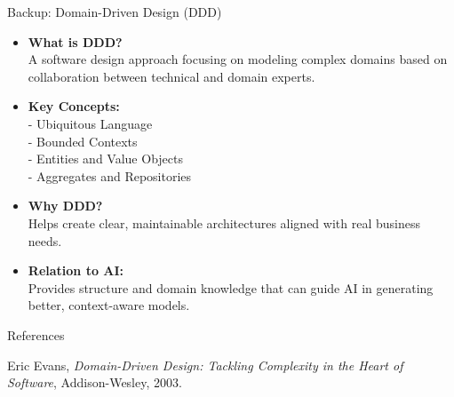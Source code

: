 \documentclass[aspectratio=169,12pt]{beamer}
\begin{document}
%
\begin{frame}{Backup: Domain-Driven Design (DDD)}
    \begin{itemize}
        \item \textbf{What is DDD?} \\
        A software design approach focusing on modeling complex domains based on collaboration between technical and domain experts.
        
        \item \textbf{Key Concepts:} \\
        - Ubiquitous Language \\
        - Bounded Contexts \\
        - Entities and Value Objects \\
        - Aggregates and Repositories
        
        \item \textbf{Why DDD?} \\
        Helps create clear, maintainable architectures aligned with real business needs.
        
        \item \textbf{Relation to AI:} \\
        Provides structure and domain knowledge that can guide AI in generating better, context-aware models.
    \end{itemize}
\end{frame}

\begin{frame}[allowframebreaks]{References}
    \footnotesize
    \begin{thebibliography}{10}

    Eric Evans,
    \newblock \textit{Domain-Driven Design: Tackling Complexity in the Heart of Software},
    \newblock Addison-Wesley, 2003.
    \end{thebibliography}
\end{frame}
\end{document}
